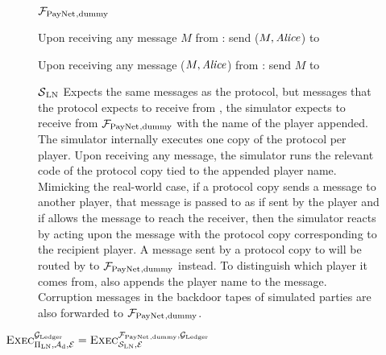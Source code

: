\begin{figure}[H]
  \begin{systembox}{$\mathcal{F}_{\mathrm{PayNet}}{}_{\mathrm{, dummy}}$}
    \begin{algorithmic}[1]
      \State Upon receiving any message $M$ from \alice:
      \Indent
          \State send ($M, \mathit{Alice}$) to \simulator
        \EndIf
      \EndIndent
      \Statex

      \State Upon receiving any message ($M, \mathit{Alice}$) from \simulator:
      \Indent
          \State send $M$ to \alice
        \EndIf
      \EndIndent
    \end{algorithmic}
  \end{systembox}
  \caption{}
  \label{alg:proof:fpaynet:dummy}
\end{figure}

\begin{figure}[H]
  \begin{simulatorbox}{$\mathcal{S}{}_{\mathrm{LN}}$}
    Expects the same messages as the protocol, but messages that the protocol
    expects to receive from \environment, the simulator expects to receive
    from $\mathcal{F}_{\mathrm{PayNet}}{}_{\mathrm{, dummy}}$ with the name of the player appended.
    The simulator internally executes one copy of the protocol per player.
    Upon receiving any message, the simulator runs the relevant code of the
    protocol copy tied to the appended player name. Mimicking the real-world
    case, if a protocol copy sends a message to another player, that message
    is passed to \adversary{} as if sent by the player and if \adversary{}
    allows the message to reach the receiver, then the simulator reacts by
    acting upon the message with the protocol copy corresponding to the
    recipient player. A message sent by a protocol copy to \environment{} will
    be routed by \simulator{} to $\mathcal{F}_{\mathrm{PayNet}}{}_{\mathrm{, dummy}}$ instead. To
    distinguish which player it comes from, \simulator{} also appends the
    player name to the message. Corruption messages in the backdoor tapes of
    simulated parties are also forwarded to $\mathcal{F}_{\mathrm{PayNet}}{}_{\mathrm{, dummy}}$.
  \end{simulatorbox}
  \caption{}
  \label{alg:sim:ln}
\end{figure}

\begin{lemma}
  \label{lemma:dummy}
  $\textsc{Exec}^{\mathcal{G}_{\mathrm{Ledger}}}_{\Pi_{\mathrm{LN}}, \mathcal{A}_{\mathrm{d}},
  \mathcal{E}} = \textsc{Exec}^{\mathcal{F}_{\mathrm{PayNet}}{}_{\mathrm{, dummy}},
  \mathcal{G}_{\mathrm{Ledger}}}_{\mathcal{S}_{\mathrm{LN}}, \mathcal{E}}$
\end{lemma}

